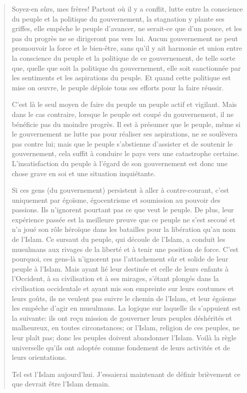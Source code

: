 \begin{quote}
Soyez-en sûrs, mes frères! Partout où il y a conflit, lutte entre la
conscience du peuple et la politique du gouvernement, la stagnation y
plante ses griffes, elle empêche le peuple d'avancer, ne serait-ce que
d'un pouce, et les pas du progrès ne se dirigeront pas vers lui. Aucun
gouvernement ne peut promouvoir la force et le bien-être, sans qu'il y
ait harmonie et union entre la conscience du peuple et la politique de
ce gouvernement, de telle sorte que, quelle que soit la politique du
gouvernement, elle soit sanctionnée par les sentiments et les
aspirations du peuple. Et quand cette politique est mise on œuvre, le
peuple déploie tous ses efforts pour la faire réussir.

C'est là le seul moyen de faire du peuple un peuple actif et vigilant.
Mais dans le cas contraire, lorsque le peuple est coupé du gouvernement,
il ne bénéficie pas du moindre progrès. Il est à présumer que le peuple,
même si le gouvernement ne lutte pas pour réaliser ses aspirations, ne
se soulèvera pas contre lui; mais que le peuple s'abstienne d'assister
et de soutenir le gouvernement, cela suffit à conduire le pays vers une
catastrophe certaine. L'insatisfaction du peuple à l'égard de son
gouvernement est donc une chose grave en soi et une situation
inquiétante.

Si ces gens (du gouvernement) persistent à aller à contre-courant, c'est
uniquement par égoïsme, égocentrisme et soumission au pouvoir des
passions. Ils n'ignorent pourtant pas ce que veut le peuple. De plus,
leur expérience passée est la meilleure preuve que ce peuple ne s'est
secoué et n'a joué son rôle héroïque dans les batailles pour la
libération qu'au nom de l'Islam. Ce sursaut du peuple, qui découle de
l'Islam, a conduit les musulmans aux rivages de la liberté et à tenir
une position de force. C'est pourquoi, ces gens-là n'ignorent pas
l'attachement sûr et solide de leur peuple à l'Islam. Mais ayant lié
leur destinée et celle de leurs enfants à l'Occident, à sa civilisation
et à ses mirages, s'étant plongés dans la civilisation occidentale et
ayant mis son empreinte sur leurs coutumes et leurs goûts, ils ne
veulent pas suivre le chemin de l'Islam, et leur égoïsme les empêche
d'agir en musulmans. La logique sur laquelle ils s'appuient est la
suivante: ils ont reçu mission de gouverner leurs peuples déshérités et
malheureux, en toutes circonstances; or l'Islam, religion de ces
peuples, ne leur plaît pas; donc les peuples doivent abandonner l'Islam.
Voilà la règle universelle qu'ils ont adoptée comme fondement de leurs
activités et de leurs orientations.

Tel est l'Islam aujourd'hui. J'essaierai maintenant de définir
brièvement ce que devrait être l'Islam demain.
\end{quote}

